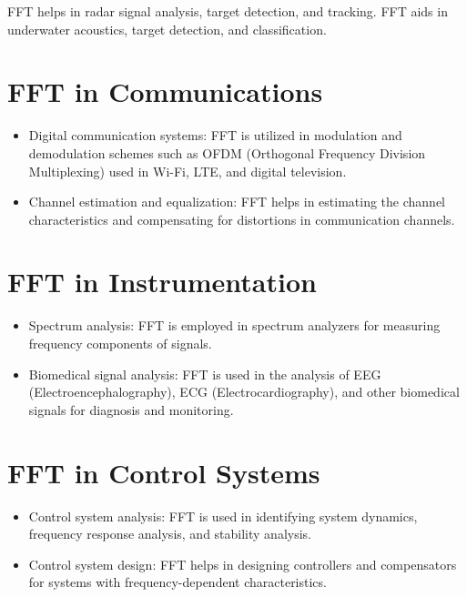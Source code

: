 \documentclass[28]{report}
\begin{document}
FFT helps in radar signal analysis, target detection, and tracking. FFT aids in underwater acoustics, target detection, and classification. 
\section{FFT in Communications}
    \begin{itemize}[]
            \item Digital communication systems: FFT is utilized in modulation and demodulation schemes such as OFDM (Orthogonal Frequency Division Multiplexing) used in Wi-Fi, LTE, and digital television.
            \item Channel estimation and equalization: FFT helps in estimating the channel characteristics and compensating for distortions in communication channels.
    \end{itemize}
\section{FFT in Instrumentation}
\begin{itemize}[]
            \item Spectrum analysis: FFT is employed in spectrum analyzers for measuring frequency components of signals.
            \item Biomedical signal analysis: FFT is used in the analysis of EEG (Electroencephalography), ECG (Electrocardiography), and other biomedical signals for diagnosis and monitoring.
        \end{itemize}
\section{FFT in Control Systems}
    \begin{itemize}[]
            \item Control system analysis: FFT is used in identifying system dynamics, frequency response analysis, and stability analysis.
            \item Control system design: FFT helps in designing controllers and compensators for systems with frequency-dependent characteristics.
    \end{itemize}
\end{document}
